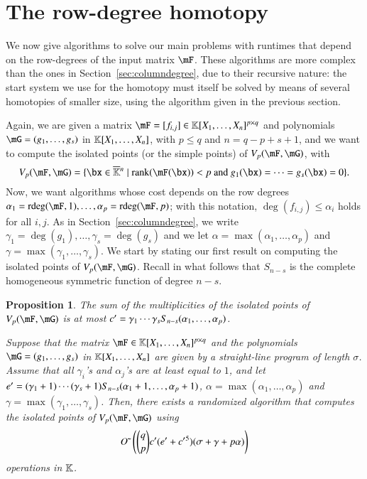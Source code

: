 \documentclass[amsthm]{elsart}
\newtheorem{proposition}[definition]{Proposition}
\begin{document}

\section{The row-degree homotopy}\label{sec:rowdegree}

We now give algorithms to solve our main problems with  runtimes that
depend on the row-degrees of the input matrix $\mF$. These algorithms
are more complex than the ones in Section~\ref{sec:columndegree}, due
to their recursive nature: the start system we use for the homotopy
must itself be solved by means of several homotopies of smaller size,
using the algorithm given in the previous section.

Again, we are given a matrix $\mF =[f_{i,j}]\in \KK[X_1,\dots,X_n]^{p
  \times q}$ and polynomials $\mG=(g_1,\dots,g_s)$ in
$\mathbb{K}[X_1,\dots,X_n]$, with $p \leq q$ and $n = q-p+s+1$, and we want
to compute the isolated points (or the simple points) of
$\VpFG{p}{\mF}{\mG}$, with
$$\VpFG{p}{\mF}{\mG} = \{\bx \in \KKbar{}^n \mid
\mathrm{rank}(\mF({\bx})) < p \text{~and~}
g_1(\bx)=\cdots=g_s(\bx)=0\}.$$ Now, we want algorithms whose cost
depends on the row degrees
$\alpha_1=\rdeg(\mF,1),\dots,\alpha_p=\rdeg(\mF,p)$; with this
notation, $\deg(f_{i,j}) \leq \alpha_i$ holds for all $i,j$. As in
Section~\ref{sec:columndegree}, we write
$\gamma_1=\deg(g_1),\dots,\gamma_s=\deg(g_s)$ and we let $\alpha =
\max(\alpha_1, \ldots, \alpha_p)$ and $\gamma = \max(\gamma_1, \ldots,
\gamma_s)$.  We start by stating our first result on computing the
isolated points of $\VpFG{p}{\mF}{\mG}$. Recall in what follows that
$S_{n-s}$ is the complete homogeneous symmetric function of degree
$n-s$.

\begin{proposition}\label{prop:rowdegree}
  The sum of the multiplicities of the isolated points of
  $\VpFG{p}{\mF}{\mG}$ is at most ${c'}{}=\gamma_1\cdots\gamma_s
  S_{n-s}(\alpha_1, \ldots, \alpha_p)$.
  
  Suppose that the matrix $\mF \in \KK[X_1,\dots,X_n]^{p \times q}$
  and the polynomials $\mG=(g_1,\dots,g_s)$ in $\mathbb{K}[X_1,\dots,X_n]$
  are given by a straight-line program of length $\sigma$.  Assume
  that all $\gamma_i$'s and $\alpha_j$'s are at least equal to $1$,
  and let ${e'}{}=(\gamma_1+1)\cdots(\gamma_s+1) S_{n-s}(\alpha_1+1,
  \ldots, \alpha_p+1)$, $\alpha = \max(\alpha_1, \ldots, \alpha_p)$
  and $\gamma = \max(\gamma_1, \ldots, \gamma_s)$. Then, there exists
  a randomized algorithm that computes the isolated points of
  $\VpFG{p}{\mF}{\mG}$ using
  $${O}{\,\tilde{ }\,}\left( {q \choose p} {c'}{} ({e'}{}+{c'}{}^5 )  (\sigma + \gamma+ p \alpha)  \right)$$
  operations in $\mathbb{K}$.
\end{proposition}
\end{document}
